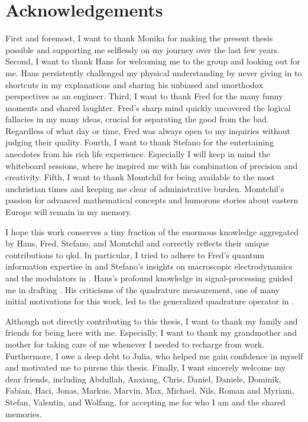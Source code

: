 
\chapter*{Acknowledgements}

First and foremost, I want to thank Monika for making the present thesis possible and supporting me selflessly on my journey over the last few years.
Second, I want to thank Hans for welcoming me to the group and looking out for me.
Hans persistently challenged my physical understanding by never giving in to shortcuts in my explanations and sharing his unbiased and unorthodox perspectives as an engineer.
Third, I want to thank Fred for the many funny moments and shared laughter.
Fred's sharp mind quickly uncovered the logical fallacies in my many ideas, crucial for separating the good from the bad.
Regardless of what day or time, Fred was always open to my inquiries without judging their quality.
Fourth, I want to thank Stefano for the entertaining anecdotes from his rich life experience.
Especially I will keep in mind the whiteboard sessions, where he inspired me with his combination of precision and creativity.
Fifth, I want to thank Momtchil for being available to the most unchristian times and keeping me clear of administrative burden.
Momtchil's passion for advanced mathematical concepts and humorous stories about eastern Europe will remain in my memory.

I hope this work conserves a tiny fraction of the enormous knowledge aggregated by Hans, Fred, Stefano, and Momtchil and correctly reflects their unique contributions to \gls{qkd}.
In particular, I tried to adhere to Fred's quantum information expertise in  and Stefano's insights on macroscopic electrodynamics and the modulators in .
Hans's profound knowledge in signal-processing guided me in drafting .
His criticisms of the quadrature measurement, one of many initial motivations for this work, led to the generalized quadrature operator in .

Although not directly contributing to this thesis, I want to thank my family and friends for being here with me.
Especially, I want to thank my grandmother and mother for taking care of me whenever I needed to recharge from work.
Furthermore, I owe a deep debt to Julia, who helped me gain confidence in myself and motivated me to pursue this thesis.
Finally, I want sincerely welcome my dear friends, including Abdullah, Anxiang, Chris, Daniel, Daniele, Dominik, Fabian, Haci, Jonas, Markus, Marvin, Max, Michael, Nils, Roman and Myriam, Stefan, Valentin, and Wolfang, for accepting me for who I am and the shared memories.
